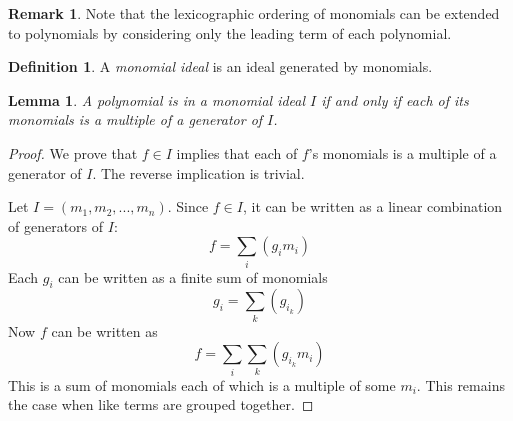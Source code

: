 \documentclass{msthesis}
\newtheorem{lemma}[theorem]{Lemma}
\theoremstyle{definition}
\newtheorem{definition}[theorem]{Definition}
\newtheorem*{remark}{Remark}
\begin{document}
\begin{remark}
    Note that the lexicographic ordering of monomials can be extended to polynomials by considering only the leading term of each polynomial.
\end{remark}

\begin{definition}
    A \emph{monomial ideal} is an ideal generated by monomials.
\end{definition}

\begin{lemma}\label{lemma:monideal}
    A polynomial is in a monomial ideal $I$ if and only if each of its monomials is a multiple of a generator of $I$.
\end{lemma}
\begin{proof}
    We prove that $f \in I$ implies that each of $f$'s monomials is a multiple of a generator of $I$.  The reverse implication is trivial.
    
    Let $I = (m_1, m_2, ..., m_n)$.  Since $f \in I$, it can be written as a linear combination of generators of $I$:
    \[ f = \sum_i (g_im_i)\]
    Each $g_i$ can be written as a finite sum of monomials
    \[ g_i = \sum_k (g_{i_k}) \]
    Now $f$ can be written as
    \[ f = \sum_i \sum_k (g_{i_k}m_i)\]
    This is a sum of monomials each of which is a multiple of some $m_i$.
    This remains the case when like terms are grouped together.
\end{proof}
\end{document}
